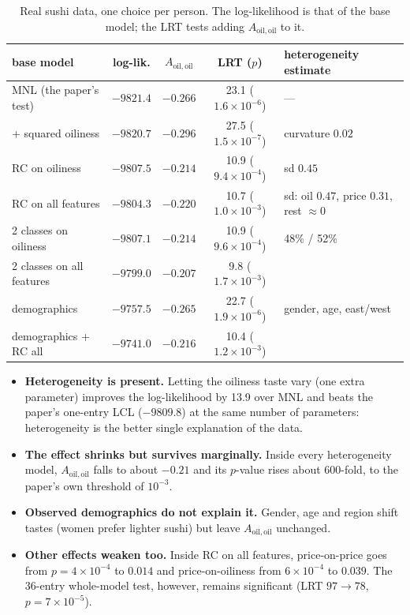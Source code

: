 \documentclass[11pt,a4paper]{article}
\theoremstyle{remark}
\newcommand{\Aoo}{A_{\mathrm{oil,oil}}}
\begin{document}
\begin{table}[!htbp]
\centering\small
\begin{tabular}{lcccl}
\toprule
base model & log-lik. & $\Aoo$ & LRT ($p$) & heterogeneity estimate\\
\midrule
MNL (the paper's test) & $-9821.4$ & $-0.266$ & 23.1 ($1.6\times10^{-6}$) & ---\\
+ squared oiliness & $-9820.7$ & $-0.296$ & 27.5 ($1.5\times10^{-7}$) & curvature $0.02$\\
RC on oiliness & $-9807.5$ & $-0.214$ & 10.9 ($9.4\times10^{-4}$) & sd $0.45$\\
RC on all features & $-9804.3$ & $-0.220$ & 10.7 ($1.0\times10^{-3}$) & sd: oil $0.47$, price $0.31$, rest $\approx0$\\
2 classes on oiliness & $-9807.1$ & $-0.214$ & 10.9 ($9.6\times10^{-4}$) & 48\% / 52\%\\
2 classes on all features & $-9799.0$ & $-0.207$ & 9.8 ($1.7\times10^{-3}$) & \\
demographics & $-9757.5$ & $-0.265$ & 22.7 ($1.9\times10^{-6}$) & gender, age, east/west\\
demographics + RC all & $-9741.0$ & $-0.216$ & 10.4 ($1.2\times10^{-3}$) & \\
\bottomrule
\end{tabular}
\caption{Real sushi data, one choice per person. The log-likelihood is that of the base model; the LRT
tests adding $\Aoo$ to it.}
\label{tab:real}
\end{table}

\begin{itemize}
\item \textbf{Heterogeneity is present.} Letting the oiliness taste vary (one extra parameter) improves the
      log-likelihood by 13.9 over MNL and beats the paper's one-entry LCL ($-9809.8$) at the same number of
      parameters: heterogeneity is the better single explanation of the data.
\item \textbf{The effect shrinks but survives marginally.} Inside every heterogeneity model, $\Aoo$ falls to
      about $-0.21$ and its $p$-value rises about 600-fold, to the paper's own threshold of $10^{-3}$.
\item \textbf{Observed demographics do not explain it.} Gender, age and region shift tastes (women prefer
      lighter sushi) but leave $\Aoo$ unchanged.
\item \textbf{Other effects weaken too.} Inside RC on all features, price-on-price goes from $p=4\times10^{-4}$ to
      $0.014$ and price-on-oiliness from $6\times10^{-4}$ to $0.039$. The 36-entry whole-model test, however,
      remains significant (LRT $97\to78$, $p=7\times10^{-5}$).
\end{itemize}
\end{document}
